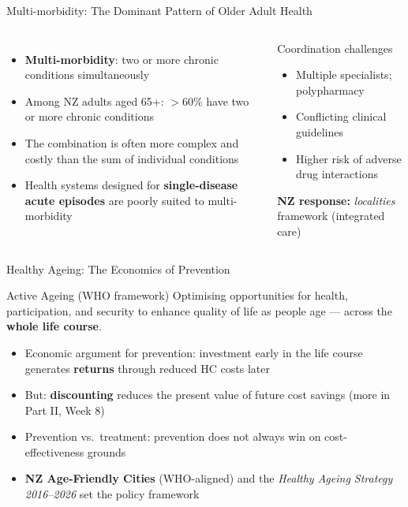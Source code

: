 \documentclass[aspectratio=169, 12pt]{beamer}
\begin{document}
\begin{frame}{Multi-morbidity: The Dominant Pattern of Older Adult Health}
  \begin{columns}
      \small
      \begin{itemize}
        \item \textbf{Multi-morbidity}: two or more chronic conditions simultaneously
        \item Among NZ adults aged 65+: $>$60\% have two or more chronic conditions
        \item The combination is often more complex and costly than the sum of individual
              conditions
        \item Health systems designed for \textbf{single-disease acute episodes} are poorly
              suited to multi-morbidity
      \end{itemize}
      \begin{alertblock}{Coordination challenges}
        \small
        \begin{itemize}
          \item Multiple specialists; polypharmacy
          \item Conflicting clinical guidelines
          \item Higher risk of adverse drug interactions
        \end{itemize}
        \footnotesize\textbf{NZ response:} \textit{localities} framework (integrated care)
      \end{alertblock}
  \end{columns}
\end{frame}

\begin{frame}{Healthy Ageing: The Economics of Prevention}
  \begin{block}{Active Ageing (WHO framework)}
    \small Optimising opportunities for health, participation, and security to enhance quality of
    life as people age --- across the \textbf{whole life course}.
  \end{block}
  \begin{itemize}
    \item Economic argument for prevention: investment early in the life course generates
          \textbf{returns} through reduced HC costs later
    \item But: \textbf{discounting} reduces the present value of future cost savings
          (more in Part II, Week 8)
    \item Prevention vs.\ treatment: prevention does not always win on cost-effectiveness grounds
    \item \textbf{NZ Age-Friendly Cities} (WHO-aligned) and the \textit{Healthy Ageing
          Strategy 2016--2026} set the policy framework
  \end{itemize}
\end{frame}
\end{document}
